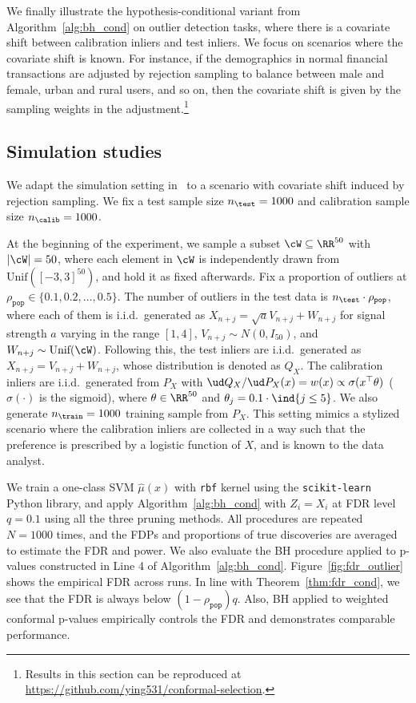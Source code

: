We finally illustrate the hypothesis-conditional variant
from Algorithm~\ref{alg:bh_cond} on outlier detection tasks,
where there is a covariate shift between calibration inliers
and test inliers. We focus on scenarios where the covariate shift
is known. For instance, if the demographics in normal financial transactions
are adjusted by rejection sampling
to balance between male  and female, urban and rural users, and so on, then
the covariate shift is given by the sampling weights in the adjustment.\footnote{Results in this section can be reproduced at \href{https://github.com/ying531/conformal-selection}{https://github.com/ying531/conformal-selection}.}

\subsection{Simulation studies}

We adapt the simulation setting in~\cite{bates2021testing}
to a scenario with covariate shift induced by rejection sampling.
We fix a test sample size $n_{\test} = 1000$ and
calibration sample size $n_\calib=1000$.

At the beginning of the experiment, we sample a subset $\cW\subseteq \RR^{50}$ with $|\cW|=50$, where each element in $\cW$ is
independently drawn from $\textrm{Unif}([-3,3]^{50})$,
and hold it as fixed afterwards.
Fix a proportion of outliers at $\rho_{\texttt{pop}}\in \{0.1,0.2,\dots,0.5\}$.
The number of outliers in the test data
is $n_\test \cdot \rho_{\texttt{pop}}$,
where each of them is i.i.d.~generated as
$X_{n+j}=\sqrt{a}V_{n+j}+W_{n+j}$
for signal strength $a$ varying in the range $[1,4]$,
$V_{n+j}\sim N(0,I_{50})$, and $W_{n+j}\sim \textrm{Unif}(\cW)$.
Following this, the test inliers are i.i.d.~generated as
$X_{n+j}= V_{n+j}+W_{n+j}$, whose distribution is denoted as $Q_X$.
The calibration inliers are i.i.d.~generated from
$P_X$ with $\ud Q_X/\ud P_X(x)=w(x)\propto \sigma(x^\top\theta)$ ($\sigma(\cdot)$ is the sigmoid), where $\theta\in \RR^{50}$ and $\theta_j=0.1\cdot\ind\{j\leq 5\}$.
We also generate $n_{\train}=1000$ training sample from $P_X$. This setting mimics a stylized scenario
where the calibration inliers are collected in a way such
that the preference is prescribed by a logistic function of $X$,
and is known to the data analyst.

We train a one-class SVM $\hat\mu(x)$ with \texttt{rbf} kernel using
the \texttt{scikit-learn} Python library,
and apply Algorithm~\ref{alg:bh_cond} with $Z_i=X_i$ at
FDR level $q=0.1$
using all the three pruning methods.
All procedures are repeated $N=1000$ times,
and the FDPs and proportions of true discoveries are averaged
to estimate the FDR and power. We also evaluate the BH
procedure applied to p-values constructed in Line 4 of
Algorithm~\ref{alg:bh_cond}.
Figure~\ref{fig:fdr_outlier} shows the
empirical FDR across runs. In line with Theorem~\ref{thm:fdr_cond}, we see that the FDR is
always below $(1-\rho_{\texttt{pop}})q$. Also,
BH applied to weighted conformal p-values
empirically controls the FDR and demonstrates comparable performance.

